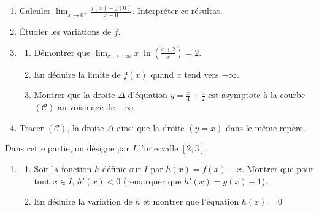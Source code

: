 \begin{exo}
\begin{description}
\begin{enumerate}
\begin{enumerate}
                                          et d\'emontrer que $f$ est continue en $0$.
                                    \item Calculer $\displaystyle{\lim_{x\rightarrow 0^+} \frac{f(x) - f(0)}{x-0}}$.
                                          Interpr\'eter ce r\'esultat.
                                    \item \'Etudier les variations de $f$.
                                    \item \begin{enumerate}
                                                \item D\'emontrer que 
                                                      $\displaystyle{
                                                      \lim_{x\rightarrow+\infty} x \; \ln \left( \frac{x+2}{x} \right) = 2
                                                      }$.
                                                \item En d\'eduire la limite de $f(x)$ quand $x$ tend vers $+\infty$.
                                                \item Montrer que la droite $\Delta$ d'\'equation 
                                                      $ y = \frac{x}{4} + \frac{5}{2}$
                                                      est asymptote \`a la courbe $(\mathscr{C})$ au voisinage de $+\infty$.
                                          \end{enumerate}
                                    \item Tracer $(\mathscr{C})$, la droite $\Delta$ ainsi que la droite $(y=x)$ 
                                          dans le m\^eme rep\`ere.
                              \end{enumerate}
                  \end{enumerate}
            \item[Partie B :]
                  Dans cette partie, on d\'esigne par $I$ l'intervalle $[2;3]$.
                  \begin{enumerate}
                        \item \begin{enumerate}
                                    \item Soit la fonction $h$ d\'efinie sur $I$ par $h(x) = f(x) - x$.
                                          Montrer que pour tout $x \in I$, $h'(x) < 0$
                                          (remarquer que $h'(x) = g(x) - 1$).
                                    \item En d\'eduire la variation de $h$ et montrer que l'\'equation $h(x) = 0$

\end{enumerate}
\end{enumerate}
\end{description}
\end{exo}
